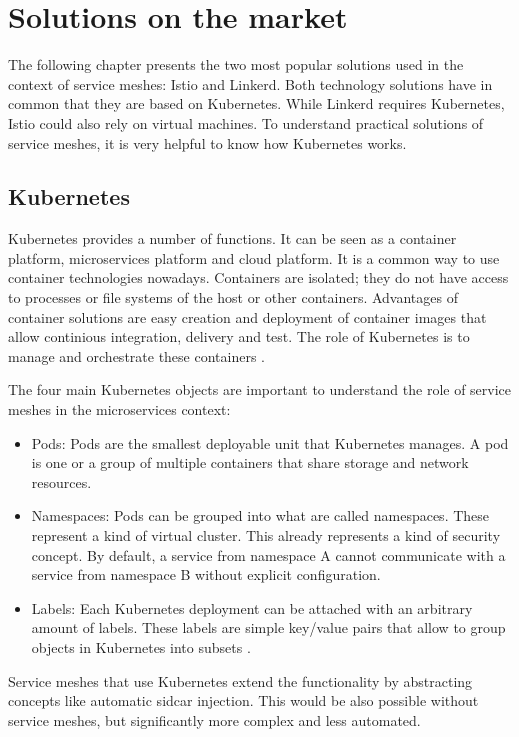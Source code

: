 \section{Solutions on the market}

The following chapter presents the two most popular solutions used in the context of service meshes: Istio and Linkerd. Both technology solutions have in common that they are based on Kubernetes. While Linkerd requires Kubernetes, Istio could also rely on virtual machines. To understand practical solutions of service meshes, it is very helpful to know how Kubernetes works.

\subsection{Kubernetes}

Kubernetes provides a number of functions. It can be seen as a container platform, microservices platform and cloud platform.
It is a common way to use container technologies nowadays. Containers are isolated; they do not have access to processes or file systems of the host or other containers.
Advantages of container solutions are easy creation and deployment of container images that allow continious integration, delivery and test. The role of Kubernetes is to manage and orchestrate these containers \cite{k8s}.

The four main Kubernetes objects are important to understand the role of service meshes in the microservices context:
\begin{itemize}
\item Pods: Pods are the smallest deployable unit that Kubernetes manages. A pod is one or a group of multiple containers that share storage and network resources.
\item Namespaces: Pods can be grouped into what are called namespaces. These represent a kind of virtual cluster. This already represents a kind of security concept. By default, a service from namespace A cannot communicate with a service from namespace B without explicit configuration.
\item Labels: Each Kubernetes deployment can be attached with an arbitrary amount of labels. These labels are simple key/value pairs that allow to group objects in Kubernetes into subsets \cite{k8s}.
\end{itemize}

Service meshes that use Kubernetes extend the functionality by abstracting concepts like automatic sidcar injection. This would be also possible without service meshes, but significantly more complex and less automated.

